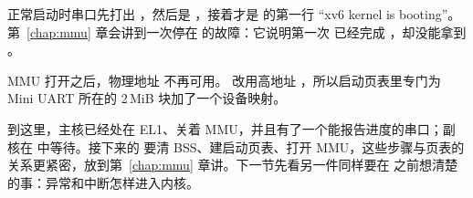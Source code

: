 正常启动时串口先打出 ，然后是 ，接着才是  的第一行 “xv6 kernel is booting”。第~\ref{chap:mmu} 章会讲到一次停在  的故障：它说明第一次  已经完成 ，却没能拿到 。

MMU 打开之后，物理地址  不再可用。 改用高地址 ，所以启动页表里专门为 Mini UART 所在的 2\,MiB 块加了一个设备映射。

到这里，主核已经处在 EL1、关着 MMU，并且有了一个能报告进度的串口；副核在  中等待。接下来的  要清 BSS、建启动页表、打开 MMU，这些步骤与页表的关系更紧密，放到第~\ref{chap:mmu} 章讲。下一节先看另一件同样要在  之前想清楚的事：异常和中断怎样进入内核。
